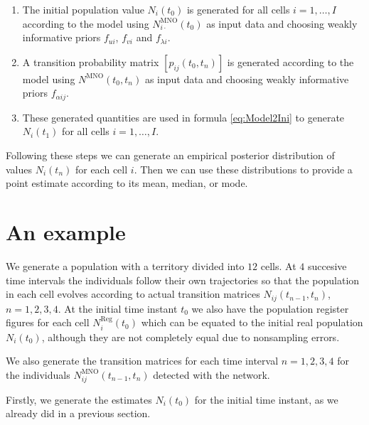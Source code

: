 \documentclass[12pt, a4paper]{article}
\begin{document}
\begin{enumerate}
	\item The initial population value $N_{i}(t_{0})$ is generated for all cells $i=1,\dots, I$ according to the model using $N_{i\cdot}^{\textrm{MNO}}(t_{0})$ as input data and choosing weakly informative priors $f_{ui}$, $f_{vi}$ and $f_{\lambda i}$.
	\item A transition probability matrix $[p_{ij}(t_{0}, t_{n})]$ is generated according to the model using $N^{\textrm{MNO}}(t_{0}, t_{n})$ as input data and choosing weakly informative priors $f_{\alpha ij}$.
	\item These generated quantities are used in formula \eqref{eq:Model2Ini} to generate $N_{i}(t_{1})$ for all cells $i=1,\dots,I$.
\end{enumerate}

Following these steps we can generate an empirical posterior distribution of values $N_{i}(t_{n})$ for each cell $i$. Then we can use these distributions to provide a point estimate according to its mean, median, or mode.


\section{An example}

We generate a population with a territory divided into $12$ cells. At $4$ succesive time intervals the individuals follow their own trajectories so that the population in each cell evolves according to actual transition matrices $N_{ij}(t_{n-1}, t_{n})$, $n=1,2,3,4$. At the initial time instant $t_{0}$ we also have the population register figures for each cell $N_{i}^{\textrm{Reg}}(t_{0})$ which can be equated to the initial real population $N_{i}(t_{0})$, although they are not completely equal due to nonsampling errors.

We also generate the transition matrices for each time interval $n=1,2,3,4$ for the individuals $N_{ij}^{\textrm{MNO}}(t_{n-1}, t_{n})$ detected with the network.

Firstly, we generate the estimates $N_{i}(t_{0})$ for the initial time instant, as we already did in a previous section.
\end{document}
